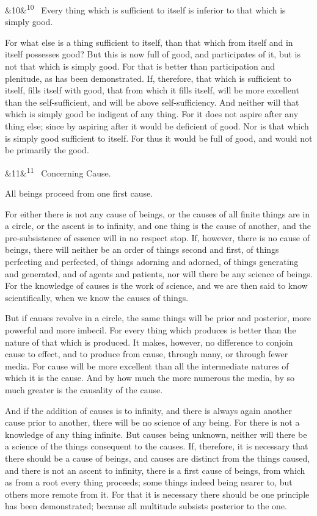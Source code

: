 \documentclass[12pt]{article}
\newcommand{\para}[1][]{\par\noindent\ifx&#1&\else\textsuperscript{\footnotesize #1}~\fi}
\begin{document}
\para[10] Every thing which is sufficient to itself is inferior to that which is simply good.

For what else is a thing sufficient to itself, than that which from itself and in itself possesses good? But this is now full of good, and participates of it, but is not that which is simply good. For that is better than participation and plenitude, as has been demonstrated. If, therefore, that which is sufficient to itself, fills itself with good, that from which it fills itself, will be more excellent than the self-sufficient, and will be above self-sufficiency. And neither will that which is simply good be indigent of any thing. For it does not aspire after any thing else; since by aspiring after it would be deficient of good. Nor is that which is simply good sufficient to itself. For thus it would be full of good, and would not be primarily the good.

\para[11] Concerning Cause.

All beings proceed from one first cause.

For either there is not any cause of beings, or the causes of all finite things are in a circle, or the ascent is to infinity, and one thing is the cause of another, and the pre-subsistence of essence will in no respect stop. If, however, there is no cause of beings, there will neither be an order of things second and first, of things perfecting and perfected, of things adorning and adorned, of things generating and generated, and of agents and patients, nor will there be any science of beings. For the knowledge of causes is the work of science, and we are then said to know scientifically, when we know the causes of things.

But if causes revolve in a circle, the same things will be prior and posterior, more powerful and more imbecil. For every thing which produces is better than the nature of that which is produced. It makes, however, no difference to conjoin cause to effect, and to produce from cause, through many, or through fewer media. For cause will be more excellent than all the intermediate natures of which it is the cause. And by how much the more numerous the media, by so much greater is the causality of the cause.

And if the addition of causes is to infinity, and there is always again another cause prior to another, there will be no science of any being. For there is not a knowledge of any thing infinite. But causes being unknown, neither will there be a science of the things consequent to the causes. If, therefore, it is necessary that there should be a cause of beings, and causes are distinct from the things caused, and there is not an ascent to infinity, there is a first cause of beings, from which as from a root every thing proceeds; some things indeed being nearer to, but others more remote from it. For that it is necessary there should be one principle has been demonstrated; because all multitude subsists posterior to the one.
\end{document}
